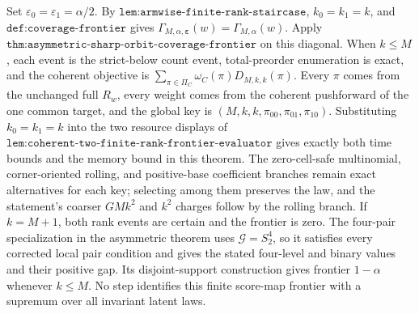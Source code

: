 Set \(\varepsilon_0=\varepsilon_1=\alpha/2\). By \(\texttt{lem:armwise-finite-rank-staircase}\), \(k_0=k_1=k\), and \(\texttt{def:coverage-frontier}\) gives \(\Gamma_{M,\alpha,\boldsymbol\varepsilon}(w)=\Gamma_{M,\alpha}(w)\). Apply \(\texttt{thm:asymmetric-sharp-orbit-coverage-frontier}\) on this diagonal. When \(k\le M\), each event is the strict-below count event, total-preorder enumeration is exact, and the coherent objective is \(\sum_{\pi\in\Pi_C}\omega_C(\pi)D_{M,k,k}(\pi)\). Every \(\pi\) comes from the unchanged full \(R_w\), every weight comes from the coherent pushforward of the one common target, and the global key is \((M,k,k,\pi_{00},\pi_{01},\pi_{10})\). Substituting \(k_0=k_1=k\) into the two resource displays of \(\texttt{lem:coherent-two-finite-rank-frontier-evaluator}\) gives exactly both time bounds and the memory bound in this theorem. The zero-cell-safe multinomial, corner-oriented rolling, and positive-base coefficient branches remain exact alternatives for each key; selecting among them preserves the law, and the statement's coarser \(GMk^2\) and \(k^2\) charges follow by the rolling branch. If \(k=M+1\), both rank events are certain and the frontier is zero. The four-pair specialization in the asymmetric theorem uses \(\mathcal G=S_2^4\), so it satisfies every corrected local pair condition and gives the stated four-level and binary values and their positive gap. Its disjoint-support construction gives frontier \(1-\alpha\) whenever \(k\le M\). No step identifies this finite score-map frontier with a supremum over all invariant latent laws.